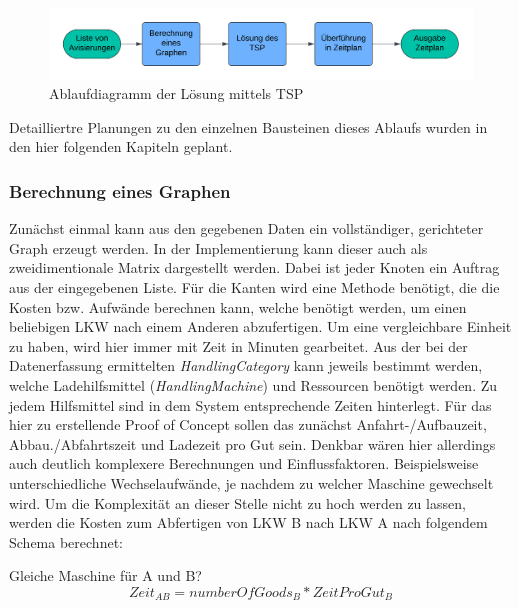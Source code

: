\begin{figure}[H]
    \centering
    \includegraphics[width=\textwidth]{images/Flowchart TSP Algorithm.png}
    \caption{Ablaufdiagramm der Lösung mittels TSP}
    \label{fig:flowchart_tsp_algorithm}
\end{figure}

Detailliertre Planungen zu den einzelnen Bausteinen dieses Ablaufs wurden in den hier folgenden Kapiteln geplant.

\subsubsection{Berechnung eines Graphen}
\label{sec:berechnungGraphenTsp}

Zunächst einmal kann aus den gegebenen Daten ein vollständiger, gerichteter Graph erzeugt werden. In der Implementierung kann dieser auch als zweidimentionale Matrix dargestellt werden. Dabei ist jeder Knoten ein Auftrag aus der eingegebenen Liste. Für die Kanten wird eine Methode benötigt, die die Kosten bzw. Aufwände berechnen kann, welche benötigt werden, um einen beliebigen LKW nach einem Anderen abzufertigen. Um eine vergleichbare Einheit zu haben, wird hier immer mit Zeit in Minuten gearbeitet. Aus der bei der Datenerfassung ermittelten \textit{HandlingCategory} kann jeweils bestimmt werden, welche Ladehilfsmittel (\textit{HandlingMachine}) und Ressourcen benötigt werden. Zu jedem Hilfsmittel sind in dem System entsprechende Zeiten hinterlegt. Für das hier zu erstellende Proof of Concept sollen das zunächst Anfahrt-/Aufbauzeit, Abbau./Abfahrtszeit und Ladezeit pro Gut sein. Denkbar wären hier allerdings auch deutlich komplexere Berechnungen und Einflussfaktoren. Beispielsweise unterschiedliche Wechselaufwände, je nachdem zu welcher Maschine gewechselt wird. Um die Komplexität an dieser Stelle nicht zu hoch werden zu lassen, werden die Kosten zum Abfertigen von LKW B nach LKW A nach folgendem Schema berechnet:

Gleiche Maschine für A und B?\\
\begin{equation} \label{eq:tspCost1}
    Zeit_{AB} = numberOfGoods_B * ZeitProGut_B
\end{equation}

